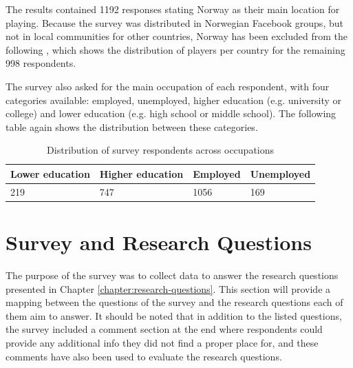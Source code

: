 The results contained 1192 responses stating Norway as their main location for playing. Because the survey was distributed in Norwegian Facebook groups, but not in local communities for other countries, Norway has been excluded from the following , which shows the distribution of players per country for the remaining 998 respondents.


The survey also asked for the main occupation of each respondent, with four categories available: employed, unemployed, higher education (e.g. university or college) and lower education (e.g. high school or middle school). The following table again shows the distribution between these categories. 

\begin{table}[h]
	\centering
	\caption{Distribution of survey respondents across occupations}
	\label{tbl:survey-occupation-distribution}
	\begin{tabularx}{\textwidth}{|l|l|X|X|}
		\hline
		\textbf{Lower education} & \textbf{Higher education} & \textbf{Employed} & \textbf{Unemployed}\\
		\hline\hline
		
		219 & 747 & 1056 & 169\\
		\hline
	\end{tabularx}
\end{table}



\section{Survey and Research Questions}

The purpose of the survey was to collect data to answer the research questions presented in Chapter \ref{chapter:research-questions}. This section will provide a mapping between the questions of the survey and the research questions each of them aim to answer. It should be noted that in addition to the listed questions, the survey included a comment section at the end where respondents could provide any additional info they did not find a proper place for, and these comments have also been used to evaluate the research questions.


